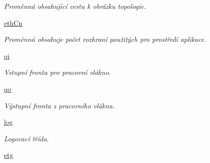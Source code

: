 \begin{DoxyCompactItemize}
\begin{DoxyCompactList}\small\item\em Proměnná obsahující cestu k obrázku topologie. \end{DoxyCompactList}\item 
\hypertarget{classcloseSetup_1_1App_a9bfeb9f737a935b2489732ac5940af55}{\hyperlink{classcloseSetup_1_1App_a9bfeb9f737a935b2489732ac5940af55}{eth\-Cn}}\label{df/df9/classcloseSetup_1_1App_a9bfeb9f737a935b2489732ac5940af55}

\begin{DoxyCompactList}\small\item\em Proměnná obsahuje počet rozhraní použitých pro prostředí aplikace. \end{DoxyCompactList}\item 
\hypertarget{classcloseSetup_1_1App_ad94e177d0372d391443a7441da20de8b}{\hyperlink{classcloseSetup_1_1App_ad94e177d0372d391443a7441da20de8b}{qi}}\label{df/df9/classcloseSetup_1_1App_ad94e177d0372d391443a7441da20de8b}

\begin{DoxyCompactList}\small\item\em Vstupní fronta pro pracovní vlákno. \end{DoxyCompactList}\item 
\hypertarget{classcloseSetup_1_1App_afece39b57a288035a847c0c3590e393a}{\hyperlink{classcloseSetup_1_1App_afece39b57a288035a847c0c3590e393a}{qo}}\label{df/df9/classcloseSetup_1_1App_afece39b57a288035a847c0c3590e393a}

\begin{DoxyCompactList}\small\item\em Výstupní fronta z pracovního vlákna. \end{DoxyCompactList}\item 
\hypertarget{classcloseSetup_1_1App_a8147f5fac97abc783c832707ca0adb56}{\hyperlink{classcloseSetup_1_1App_a8147f5fac97abc783c832707ca0adb56}{log}}\label{df/df9/classcloseSetup_1_1App_a8147f5fac97abc783c832707ca0adb56}

\begin{DoxyCompactList}\small\item\em Logovací třída. \end{DoxyCompactList}\item 
\hypertarget{classcloseSetup_1_1App_a24826e8679eaa9d1866df9e1172dc716}{\hyperlink{classcloseSetup_1_1App_a24826e8679eaa9d1866df9e1172dc716}{etg}}\label{df/df9/classcloseSetup_1_1App_a24826e8679eaa9d1866df9e1172dc716}


\end{DoxyCompactItemize}

